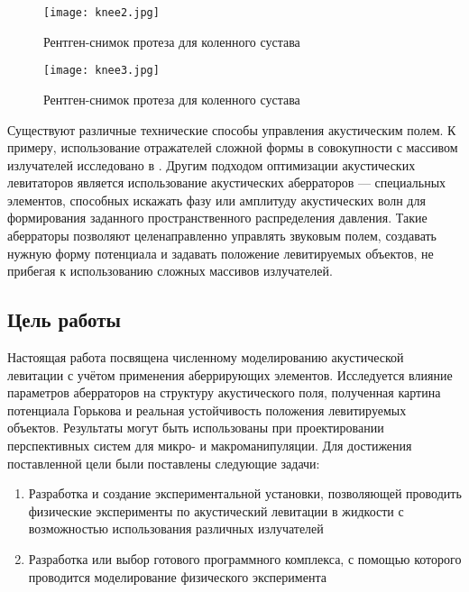 \begin{figure}[H]
	\centering
	\texttt{[image: knee2.jpg]}
	\caption{Рентген-снимок протеза для коленного сустава}
	\label{fig:knee2}
\end{figure} 

\begin{figure}[H]
	\centering
	\texttt{[image: knee3.jpg]}
	\caption{Рентген-снимок протеза для коленного сустава}
	\label{fig:knee3}
\end{figure} 

Существуют различные технические способы управления акустическим полем. К примеру, использование отражателей сложной формы в совокупности с массивом излучателей исследовано в \cite{nature_acoustics}. Другим подходом оптимизации акустических левитаторов является использование акустических аберраторов — специальных элементов, способных искажать фазу или амплитуду акустических волн для формирования заданного пространственного распределения давления. Такие аберраторы позволяют целенаправленно управлять звуковым полем, создавать нужную форму потенциала и задавать положение левитируемых объектов, не прибегая к использованию сложных массивов излучателей.

\subsection{Цель работы}

Настоящая работа посвящена численному моделированию акустической левитации с учётом применения аберрирующих элементов. Исследуется влияние параметров аберраторов на структуру акустического поля, полученная картина потенциала Горькова и реальная устойчивость положения левитируемых объектов. Результаты могут быть использованы при проектировании перспективных систем для микро- и макроманипуляции. Для достижения поставленной цели были поставлены следующие задачи:
\begin{enumerate}
	\item Разработка и создание экспериментальной установки, позволяющей проводить физические эксперименты по акустический левитации в жидкости с возможностью использования различных излучателей
	\item Разработка или выбор готового программного комплекса, с помощью которого проводится моделирование физического эксперимента
\end{enumerate}

\newpage
